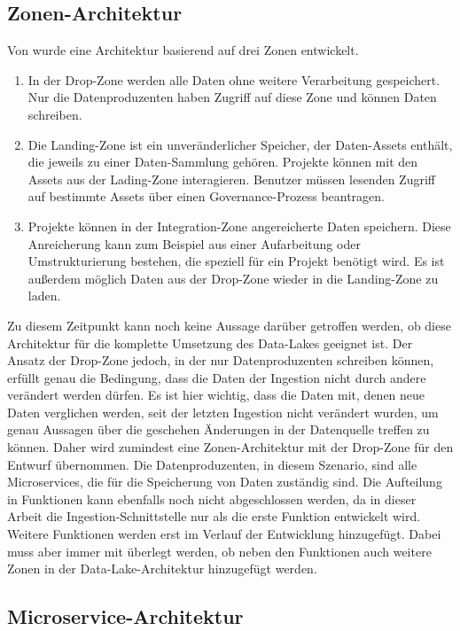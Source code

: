 \subsection{Zonen-Architektur}
Von \textcite{ingestion_02} wurde eine Architektur basierend auf drei Zonen entwickelt.
\begin{enumerate}
    \item In der Drop-Zone werden alle Daten ohne weitere Verarbeitung gespeichert.
    Nur die Datenproduzenten haben Zugriff auf diese Zone und können Daten schreiben.
    \item Die Landing-Zone ist ein unveränderlicher Speicher, der Daten-Assets enthält, die jeweils zu einer Daten-Sammlung gehören. Projekte können mit den Assets aus der Lading-Zone interagieren.
    Benutzer müssen lesenden Zugriff auf bestimmte Assets über einen Governance-Prozess beantragen.
    \item Projekte können in der Integration-Zone angereicherte Daten speichern.
    Diese Anreicherung kann zum Beispiel aus einer Aufarbeitung oder Umstrukturierung bestehen, die speziell für ein Projekt benötigt wird.
    Es ist außerdem möglich Daten aus der Drop-Zone wieder in die Landing-Zone zu laden.
\end{enumerate}
Zu diesem Zeitpunkt kann noch keine Aussage darüber getroffen werden, ob diese Architektur für die komplette Umsetzung des Data-Lakes geeignet ist.
Der Ansatz der Drop-Zone jedoch, in der nur Datenproduzenten schreiben können, erfüllt genau die Bedingung, dass die Daten der Ingestion nicht durch andere verändert werden dürfen.
Es ist hier wichtig, dass die Daten mit, denen neue Daten verglichen werden, seit der letzten Ingestion nicht verändert wurden, um genau Aussagen über die geschehen Änderungen in der Datenquelle treffen zu können.
Daher wird zumindest eine Zonen-Architektur mit der Drop-Zone für den Entwurf übernommen.
Die Datenproduzenten, in diesem Szenario, sind alle Microservices, die für die Speicherung von Daten zuständig sind.
Die Aufteilung in Funktionen kann ebenfalls noch nicht abgeschlossen werden, da in dieser Arbeit die Ingestion-Schnittstelle nur als die erste Funktion entwickelt wird.
Weitere Funktionen werden erst im Verlauf der Entwicklung hinzugefügt.
Dabei muss aber immer mit überlegt werden, ob neben den Funktionen auch weitere Zonen in der Data-Lake-Architektur hinzugefügt werden.

\subsection{Microservice-Architektur}
\label{sec:arch}


